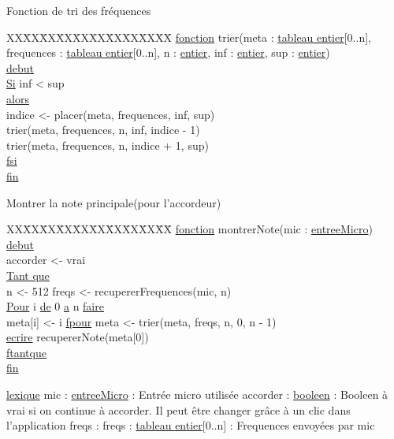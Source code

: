 Fonction de tri des fréquences\newline
\begin{tabbing}
\kill XX\=XX\=XX\=XX\=XX\=XX\=XX\=XX\=XX\=XX\=
\kill
\ul{fonction} trier(meta : \ul{tableau entier}[0..n], frequences : \ul{tableau entier}[0..n], n : \ul{entier}, inf : \ul{entier}, sup : \ul{entier})\\
\ul{debut}\\
    \>\ul{Si} inf < sup\\
    \>\ul{alors}\\
        \>\>indice <- placer(meta, frequences, inf, sup)\\
        \>\>trier(meta, frequences, n, inf, indice - 1)\\
        \>\>trier(meta, frequences, n, indice + 1, sup)\\
    \>\ul{fsi}\\
\ul{fin}\\ 
\end{tabbing}

Montrer la note principale(pour l'accordeur)\newline
\begin{tabbing}
\kill XX\=XX\=XX\=XX\=XX\=XX\=XX\=XX\=XX\=XX\=
\kill
\ul{fonction} montrerNote(mic : \ul{entreeMicro})\\
\ul{debut}\\
\>accorder <- vrai\\
\>\ul{Tant que}\\
    \>\>n <- 512
    \>\>freqs <- recupererFrequences(mic, n)\\
    \>\>\ul{Pour} i \ul{de} 0 \ul{a} n \ul{faire}\\
        \>\>\>meta[i] <- i
    \>\>\ul{fpour}
    \>\>meta <- trier(meta, freqs, n, 0, n - 1)\\
    \>\>\ul{ecrire} recupererNote(meta[0])\\
\>\ul{ftantque}\\
\ul{fin}\\
\end{tabbing}

\ul{lexique}\newline
mic : \ul{entreeMicro} : Entrée micro utilisée\newline
accorder : \ul{booleen} : Booleen à vrai si on continue à accorder. Il peut être changer grâce à un clic dans l'application\newline
freqs : freqs : \ul{tableau entier}[0..n] : Frequences envoyées par mic\newline
\newline

